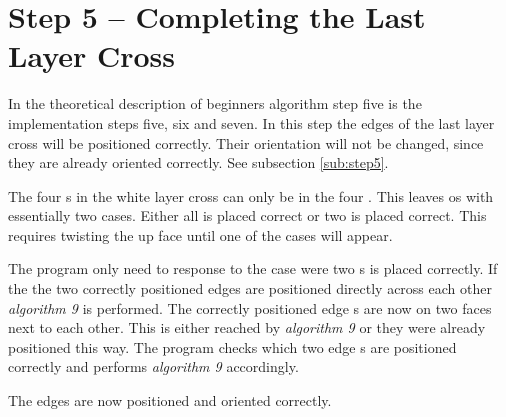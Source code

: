 \section{Step 5 -- Completing the Last Layer Cross}
In the theoretical description of beginners algorithm step five is the implementation steps five, six and seven. 
In this step the edges of the last layer cross will be positioned correctly. Their orientation will not be changed, since they are already oriented correctly. See subsection \ref{sub:step5}.

The four \cpiece{}s in the white layer cross can only be in the four \cubicle{}. This leaves os with essentially two cases. Either all is placed correct or two is placed correct. This requires twisting the up face until one of the cases will appear. 

The program only need to response to the case were two \cpiece{}s is placed correctly. 
If the the two correctly positioned edges are positioned directly across each other \textit{algorithm 9} is performed.
The correctly positioned edge \cpiece{}s are now on two faces next to each other. This is either reached by \textit{algorithm 9} or they were already positioned this way.
The program checks which two edge \cpiece{}s are positioned correctly and performs \textit{algorithm 9} accordingly. 

The edges are now positioned and oriented correctly.